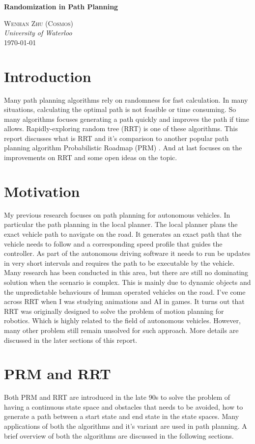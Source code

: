 \documentclass[12pt]{article}
\renewcommand{\maketitle}{
    \begin{flushright}
        {\LARGE \textbf{Randomization in Path Planning}}


    {\large \textsc{Wenhan Zhu (Cosmos)} \\ \textit{University of Waterloo}}
    \\ \today

    \end{flushright}
}
\begin{document}
\maketitle

\section*{Introduction}
Many path planning algorithms rely on randomness for fast calculation. In many situations, calculating the optimal path is not feasible or time consuming. So many algorithms focuses generating a path quickly and improves the path if time allows. Rapidly-exploring random tree (RRT)\cite{LaValle1998} is one of these algorithms. This report discusses what is RRT and it's comparison to another popular path planning algorithm Probabilistic Roadmap (PRM) \cite{Kavraki1996}. And at last focuses on the improvements on RRT and some open ideas on the topic.

\section*{Motivation}
My previous research focuses on path planning for autonomous vehicles. In particular the path planning in the local planner. The local planner plans the exact vehicle path to navigate on the road. It generates an exact path that the vehicle needs to follow and a corresponding speed profile that guides the controller. As part of the autonomous driving software it needs to run be updates in very short intervals and requires the path to be executable by the vehicle. Many research has been conducted in this area, but there are still no dominating solution when the scenario is complex. This is mainly due to dynamic objects and the unpredictable behaviours of human operated vehicles on the road. I've come across RRT when I was studying animations and AI in games. It turns out that RRT was originally designed to solve the problem of motion planning for robotics. Which is highly related to the field of autonomous vehicles. However, many other problem still remain unsolved for such approach. More details are discussed in the later sections of this report.

\section*{PRM and RRT}
Both PRM and RRT are introduced in the late 90s to solve the problem of having a continuous state space and obstacles that needs to be avoided, how to generate a path between a start state and end state in the state spaces. Many applications of both the algorithms and it's variant are used in path planning. A brief overview of both the algorithms are discussed in the following sections. 
\end{document}
